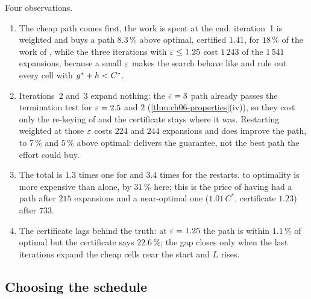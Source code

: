 Four observations.
\begin{enumerate}
  \item The cheap path comes first, the work is spent at the end: iteration~1
        is weighted \astar and buys a path $8.3\,\%$ above optimal, certified
        $1.41$, for $18\,\%$ of the work of \astar, while the three iterations
        with $\varepsilon \le 1.25$ cost $1\,243$ of the $1\,541$ expansions, because
        a small $\varepsilon$ makes the search behave like \astar and rule out every
        cell with $g^* + h < C^*$.
  \item Iterations~2 and~3 expand nothing: the $\varepsilon = 3$ path already passes
        the termination test for $\varepsilon = 2.5$ and $2$
        (\cref{thm:ch06-properties}(iv)), so they cost only the re-keying of
        \Open and the certificate stays where it was. Restarting weighted
        \astar at those $\varepsilon$ costs $224$ and $244$ expansions and does
        improve the path, to $7\,\%$ and $5\,\%$ above optimal: \arastar
        delivers the guarantee, not the best path the effort could buy.
  \item The total is $1.3$ times one \astar for \arastar and $3.4$ times for
        the restarts. \arastar to optimality is more expensive than \astar
        alone, by $31\,\%$ here; this is the price of having had a path after
        $215$ expansions and a near-optimal one ($1.01\,C^*$, certificate
        $1.23$) after $733$.
  \item The certificate lags behind the truth: at $\varepsilon = 1.25$ the path is
        within $1.1\,\%$ of optimal but the certificate says $22.6\,\%$; the
        gap closes only when the last iterations expand the cheap cells near
        the start and $L$ rises.
\end{enumerate}

\subsection{Choosing the schedule}

